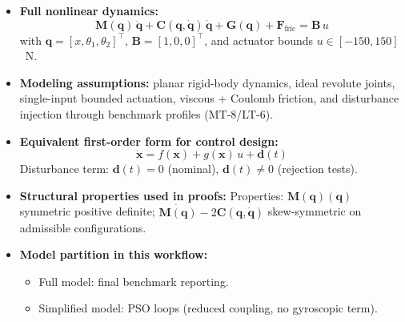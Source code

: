 \documentclass[10pt, a4paper]{article}
\newcommand{\vx}{\boldsymbol{x}}
\newcommand{\vq}{\boldsymbol{q}}
\newcommand{\Mq}{\mathbf{M}(\vq)}
\newcommand{\Cq}{\mathbf{C}(\vq,\dot{\vq})}
\newcommand{\Gq}{\mathbf{G}(\vq)}
\begin{document}
\begin{itemize}[leftmargin=1.5em,itemsep=0.2em]
  \item \textbf{Full nonlinear dynamics:}
  \begin{equation}
    \Mq\,\ddot{\vq} + \Cq\,\dot{\vq} + \Gq + \bm{F}_\text{fric}
      = \bm{B}\,u
    \label{eq:eom}
  \end{equation}
  with $\vq = [x,\theta_1,\theta_2]^\top$, $\bm{B}=[1,0,0]^\top$,
  and actuator bounds $u \in [-150,150]$~N.

  \item \textbf{Modeling assumptions:}
  planar rigid-body dynamics, ideal revolute joints, single-input bounded
  actuation, viscous + Coulomb friction, and disturbance injection through
  benchmark profiles (MT-8/LT-6).

  \item \textbf{Equivalent first-order form for control design:}
  \begin{equation}
    \dot{\vx} = f(\vx) + g(\vx)\,u + \bm{d}(t)
    \label{eq:state_space}
  \end{equation}
  Disturbance term: $\bm{d}(t)=0$ (nominal), $\bm{d}(t)\neq0$ (rejection tests).

  \item \textbf{Structural properties used in proofs:}
  Properties: $\Mq(\vq)$ symmetric positive definite; $\dot{\Mq} - 2\Cq$
  skew-symmetric on admissible configurations.

  \item \textbf{Model partition in this workflow:}
  \begin{itemize}[leftmargin=1.5em,itemsep=0.1em]
    \item Full model: final benchmark reporting.
    \item Simplified model: PSO loops (reduced coupling, no gyroscopic term).
  \end{itemize}
\end{itemize}
\end{document}
